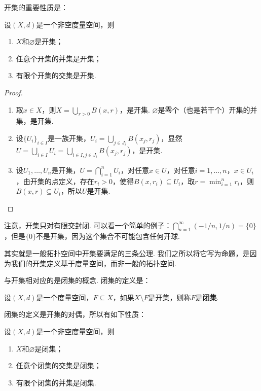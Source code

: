 开集的重要性质是：

\begin{proposition}\label{prop:open-prop}
    设$(X,d)$是一个非空度量空间，则
    \begin{enumerate}
        \item $X$和$\varnothing$是开集；
        \item 任意个开集的并集是开集；
        \item 有限个开集的交集是开集. 
    \end{enumerate}
\end{proposition}
\begin{proof}
\begin{enumerate}
    \item 取$x\in X$，则$X=\bigcup_{r>0}B(x,r)$，是开集. $\varnothing$是零个（也是若干个）开集的并集，是开集. 

    \item 设$\{U_i\}_{i\in I}$是一族开集，$U_i=\bigcup_{j\in J_i} B(x_j,r_j)$，显然$U=\bigcup_{i\in I}U_i=\bigcup_{i\in I,j\in J_i} B(x_j,r_j)$，是开集. 

    \item 设$U_1,\dots,U_n$是开集，$U=\bigcap_{i=1}^nU_i$，对任意$x\in U$，对任意$i=1,\dots,n$，$x\in U_i$，由开集的点定义，存在$r_i>0$，使得$B(x,r_i)\subseteq U_i$，取$r=\min_{i=1}^n r_i$，则$B(x,r)\subseteq U_i$，所以$U$是开集. 
\end{enumerate}
\end{proof}

注意，开集只对有限交封闭. 可以看一个简单的例子：$\bigcap_{n=1}^\infty(-1/n,1/n)=\{0\}$，但是$\{0\}$不是开集，因为这个集合不可能包含任何开球. 

 其实就是一般拓扑空间中开集要满足的三条公理. 我们之所以将它写为命题，是因为我们的开集定义基于度量空间，而非一般的拓扑空间.

与开集相对应的是闭集的概念. 闭集的定义是：

\begin{definition}[闭集]
    设$(X,d)$是一个度量空间，$F\subseteq X$，如果$X\setminus F$是开集，则称$F$是\textbf{闭集}. 
\end{definition}
闭集的定义是开集的对偶，所以有如下性质：

\begin{proposition}\label{prop:closed-prop}
    设$(X,d)$是一个非空度量空间，则
    \begin{enumerate}
        \item $X$和$\varnothing$是闭集；
        \item 任意个闭集的交集是闭集；
        \item 有限个闭集的并集是闭集. 
    \end{enumerate}
\end{proposition}

